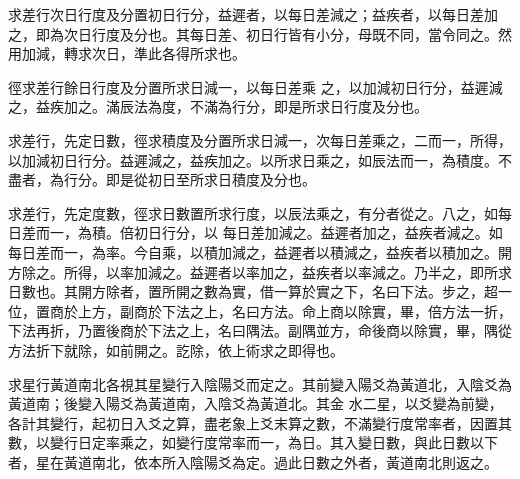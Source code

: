 \begin{pinyinscope}
 求差行次日行度及分置初日行分，益遲者，以每日差減之；益疾者，以每日差加之，即為次日行度及分也。其每日差、初日行皆有小分，母既不同，當令同之。然用加減，轉求次日，準此各得所求也。



 徑求差行餘日行度及分置所求日減一，以每日差乘
 之，以加減初日行分，益遲減之，益疾加之。滿辰法為度，不滿為行分，即是所求日行度及分也。



 求差行，先定日數，徑求積度及分置所求日減一，次每日差乘之，二而一，所得，以加減初日行分。益遲減之，益疾加之。以所求日乘之，如辰法而一，為積度。不盡者，為行分。即是從初日至所求日積度及分也。



 求差行，先定度數，徑求日數置所求行度，以辰法乘之，有分者從之。八之，如每日差而一，為積。倍初日行分，以
 每日差加減之。益遲者加之，益疾者減之。如每日差而一，為率。今自乘，以積加減之，益遲者以積減之，益疾者以積加之。開方除之。所得，以率加減之。益遲者以率加之，益疾者以率減之。乃半之，即所求日數也。其開方除者，置所開之數為實，借一算於實之下，名曰下法。步之，超一位，置商於上方，副商於下法之上，名曰方法。命上商以除實，畢，倍方法一折，下法再折，乃置後商於下法之上，名曰隅法。副隅並方，命後商以除實，畢，隅從方法折下就除，如前開之。訖除，依上術求之即得也。



 求星行黃道南北各視其星變行入陰陽爻而定之。其前變入陽爻為黃道北，入陰爻為黃道南；後變入陽爻為黃道南，入陰爻為黃道北。其金
 水二星，以爻變為前變，各計其變行，起初日入爻之算，盡老象上爻末算之數，不滿變行度常率者，因置其數，以變行日定率乘之，如變行度常率而一，為日。其入變日數，與此日數以下者，星在黃道南北，依本所入陰陽爻為定。過此日數之外者，黃道南北則返之。



\end{pinyinscope}